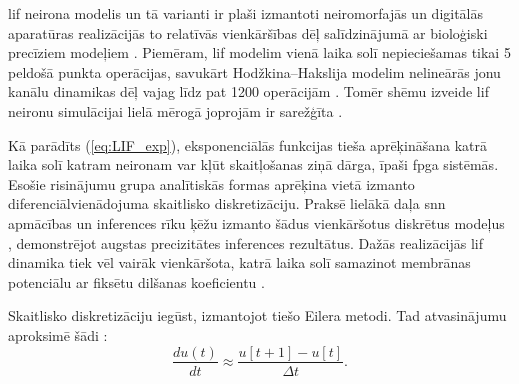 \Gls{lif} neirona modelis un tā varianti ir plaši izmantoti neiromorfajās un digitālās aparatūras realizācijās to relatīvās
vienkāršības dēļ salīdzinājumā ar bioloģiski precīziem modeļiem \cite{sommer2022, corradi2021}. Piemēram, \Gls{lif} modelim vienā
laika solī nepieciešamas tikai 5 peldošā punkta operācijas, savukārt Hodžkina–Hakslija modelim nelineārās jonu kanālu
dinamikas dēļ vajag līdz pat 1200 operācijām \cite{hwang2024}. Tomēr shēmu izveide \Gls{lif} neironu simulācijai lielā mērogā
joprojām ir sarežģīta \cite{kousanakis2017}.

Kā parādīts (\ref{eq:LIF_exp}), eksponenciālās funkcijas tieša aprēķināšana katrā laika solī katram neironam var kļūt skaitļošanas ziņā dārga, īpaši
\Gls{fpga} sistēmās.
Esošie risinājumu grupa analītiskās formas aprēķina vietā izmanto diferenciālvienādojuma skaitlisko diskretizāciju. Praksē
lielākā daļa \Gls{snn} apmācības un inferences rīku ķēžu izmanto šādus vienkāršotus diskrētus modeļus \cite{Fang2021},
demonstrējot augstas precizitātes inferences rezultātus. Dažās realizācijās \Gls{lif} dinamika tiek vēl vairāk vienkāršota, katrā laika solī samazinot membrānas potenciālu ar fiksētu dilšanas koeficientu \cite{gupta2020}.

Skaitlisko diskretizāciju iegūst, izmantojot tiešo Eilera metodi. Tad atvasinājumu aproksimē šādi \cite{guo2022, Fang2021}:
\begin{equation}
    \frac{du(t)}{dt} \approx \frac{u[t+1] - u[t]}{\Delta t}.
\end{equation}

